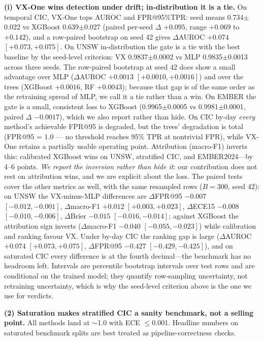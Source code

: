 \documentclass[sigconf,anonymous=false]{acmart}
\begin{document}
\textbf{(i) VX-One wins detection under drift; in-distribution it is a tie.} On temporal CIC, VX-One tops AUROC and FPR@95\%TPR: seed means 0.734$\pm$0.022 vs XGBoost 0.639$\pm$0.027 (paired per-seed $\Delta$ $+0.095$, range $+0.069$ to $+0.142$), and a row-paired bootstrap on seed 42 gives $\Delta$AUROC $+0.074$ $[+0.073,+0.075]$. On UNSW in-distribution the gate is a tie with the best baseline by the seed-level criterion: VX 0.9837$\pm$0.0002 vs MLP 0.9835$\pm$0.0013 across three seeds. The row-paired bootstrap at seed 42 does show a small advantage over MLP ($\Delta$AUROC $+0.0013$ $[+0.0010,+0.0016]$) and over the trees (XGBoost $+0.0016$, RF $+0.0043$); because that gap is of the same order as the retraining spread of MLP, we call it a tie rather than a win. On EMBER the gate is a small, consistent loss to XGBoost (0.9965$\pm$0.0005 vs 0.9981$\pm$0.0001, paired $\Delta$ $-0.0017$), which we also report rather than hide. On CIC by-day \emph{every} method's achievable FPR@95 is degraded, but the trees' degradation is total (FPR@95 = 1.0 --- no threshold reaches 95\% TPR at nontrivial FPR), while VX-One retains a partially usable operating point. Attribution (macro-F1) inverts this: calibrated XGBoost wins on UNSW, stratified CIC, and EMBER2024---by 4--6 points. \emph{We report the inversion rather than hide it}: our contribution does not rest on attribution wins, and we are explicit about the loss. The paired tests cover the other metrics as well, with the same resampled rows ($B{=}300$, seed 42): on UNSW the VX-minus-MLP differences are $\Delta$FPR@95 $-0.007$ $[-0.012,-0.001]$, $\Delta$macro-F1 $+0.012$ $[+0.003,+0.023]$, $\Delta$ECE15 $-0.008$ $[-0.010,-0.006]$, $\Delta$Brier $-0.015$ $[-0.016,-0.014]$; against XGBoost the attribution sign inverts ($\Delta$macro-F1 $-0.040$ $[-0.055,-0.023]$) while calibration and ranking favour VX. Under by-day CIC the ranking gap is large ($\Delta$AUROC $+0.074$ $[+0.073,+0.075]$, $\Delta$FPR@95 $-0.427$ $[-0.429,-0.425]$), and on saturated CIC every difference is at the fourth decimal---the benchmark has no headroom left. Intervals are percentile bootstrap intervals over test rows and are conditional on the trained model; they quantify row-sampling uncertainty, not retraining uncertainty, which is why the seed-level criterion above is the one we use for verdicts.

\textbf{(2) Saturation makes stratified CIC a sanity benchmark, not a selling point.} All methods land at $\sim$1.0 with ECE $\le$0.001. Headline numbers on saturated benchmark splits are best treated as pipeline-correctness checks.
\end{document}
